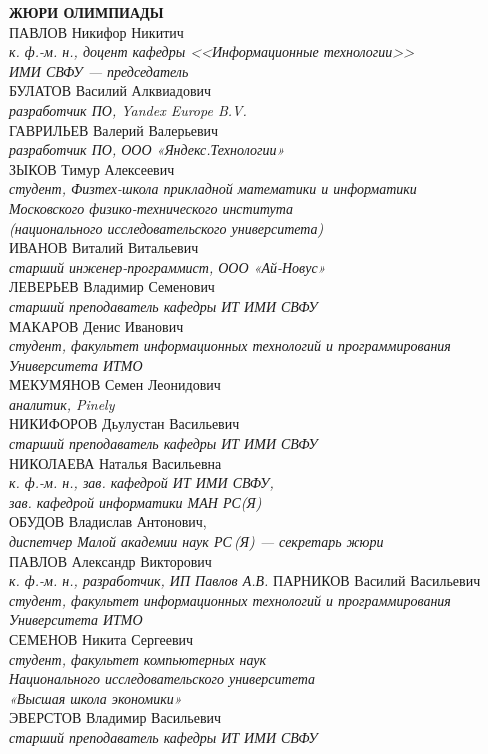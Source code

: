\noindent
\textbf{ЖЮРИ ОЛИМПИАДЫ}
\\[2mm]
ПАВЛОВ Никифор Никитич \\
\textit{к. ф.-м. н., доцент кафедры <<Информационные технологии>>\\ ИМИ СВФУ --- председатель}
\\[2mm]
БУЛАТОВ Василий Алквиадович\\
\textit{разработчик ПО, Yandex Europe B.V.}
\\[2mm]
ГАВРИЛЬЕВ Валерий Валерьевич\\
\textit{разработчик ПО, ООО «Яндекс.Технологии»}
\\[2mm]
ЗЫКОВ Тимур Алексеевич\\ 
\textit{студент, Физтех-школа прикладной математики и информатики \\
Московского физико-технического института \\
(национального исследовательского университета)}
\\[2mm]
ИВАНОВ Виталий Витальевич\\
\textit{старший инженер-программист, ООО «Ай-Новус»}
\\[2mm]
ЛЕВЕРЬЕВ Владимир Семенович \\
\textit{старший преподаватель кафедры ИТ ИМИ СВФУ}
\\[2mm]
МАКАРОВ Денис Иванович\\
\textit{студент, факультет информационных технологий и программирования Университета ИТМО}
\\[2mm]
МЕКУМЯНОВ Семен Леонидович\\
\textit{аналитик, Pinely}
\\[2mm]
НИКИФОРОВ Дьулустан Васильевич \\
\textit{старший преподаватель кафедры ИТ ИМИ СВФУ}
\\[2mm]
НИКОЛАЕВА Наталья Васильевна \\
\textit{к. ф.-м. н., зав. кафедрой ИТ ИМИ СВФУ,\\
зав. кафедрой информатики МАН РС(Я)}
\\[2mm]
ОБУДОВ Владислав Антонович, \\
\textit{диспетчер  Малой академии наук РС\,(Я) --- секретарь жюри}
\\[2mm]
ПАВЛОВ Александр Викторович \\
\textit{к. ф.-м. н., разработчик, ИП Павлов А.В.}
\newpage\noindent
ПАРНИКОВ Василий Васильевич\\
\textit{студент, факультет информационных технологий и программирования Университета ИТМО}
\\[2mm]
СЕМЕНОВ Никита Сергеевич\\
\textit{студент, факультет компьютерных наук \\
Национального исследовательского университета \\
«Высшая школа экономики»}
\\[2mm]
ЭВЕРСТОВ Владимир Васильевич \\
\textit{старший преподаватель кафедры ИТ ИМИ СВФУ}

